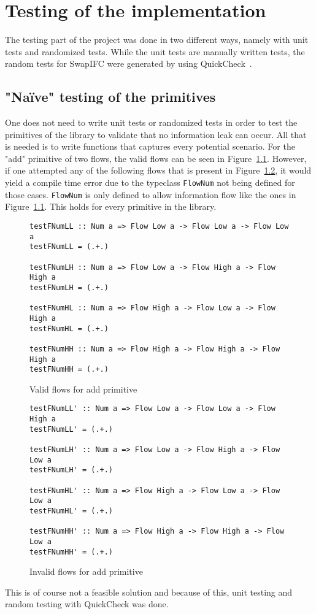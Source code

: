 \chapter{Testing of the implementation}
\label{chapter:testing}
The testing part of the project was done in two different ways, namely with unit tests and randomized tests. While the unit tests are manually written tests, the random tests for SwapIFC were generated by using QuickCheck~\cite{quickcheck, quickcheck-wiki}.
\section{"Naïve" testing of the primitives}
One does not need to write unit tests or randomized tests in order to test the primitives of the library to validate that no information leak can occur. All that is needed is to write functions that captures every potential scenario. For the "add" primitive of two flows, the valid flows can be seen in Figure~\ref{fig:validFlow}.
However, if one attempted any of the following flows that is present in Figure~\ref{fig:invalidFlow}, it would yield a compile time error due to the typeclass {\tt FlowNum} not being defined for those cases. {\tt FlowNum} is only defined to allow information flow like the ones in Figure~\ref{fig:validFlow}. This holds for every primitive in the library.
\begin{figure}[h]
\begin{verbatim}
testFNumLL :: Num a => Flow Low a -> Flow Low a -> Flow Low a
testFNumLL = (.+.)
  
testFNumLH :: Num a => Flow Low a -> Flow High a -> Flow High a
testFNumLH = (.+.)
    
testFNumHL :: Num a => Flow High a -> Flow Low a -> Flow High a
testFNumHL = (.+.)
    
testFNumHH :: Num a => Flow High a -> Flow High a -> Flow High a
testFNumHH = (.+.)
\end{verbatim}
\caption{Valid flows for add primitive}
\label{fig:validFlow}
\end{figure}
\begin{figure}[h]
\begin{verbatim}
testFNumLL' :: Num a => Flow Low a -> Flow Low a -> Flow High a
testFNumLL' = (.+.)
  
testFNumLH' :: Num a => Flow Low a -> Flow High a -> Flow Low a
testFNumLH' = (.+.)

testFNumHL' :: Num a => Flow High a -> Flow Low a -> Flow Low a
testFNumHL' = (.+.)

testFNumHH' :: Num a => Flow High a -> Flow High a -> Flow Low a
testFNumHH' = (.+.)
\end{verbatim}
\caption{Invalid flows for add primitive}
\label{fig:invalidFlow}
\end{figure}
This is of course not a feasible solution and because of this, unit testing and random testing with QuickCheck was done.

